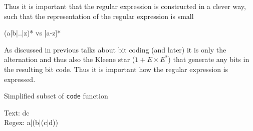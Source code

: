 \documentclass[slidestop,compress,mathserif, xcolor=table]{beamer}
\begin{document}
\begin{frame}
  
  Thus it is important that the regular expression is constructed in a clever
  way, such that the representation of the regular expression is small
  
  (a|b|..|z)* vs [a-z]* 
  
  As discussed in previous talks about bit coding (and later) it is only the
  alternation and thus also the Kleene star ($1 + E \times E^{\ast}$) that generate
  any bits in the resulting bit code.  Thus it is important how the regular
  expression is expressed.

  \begin{block}{Simplified subset of \texttt{code} function}
\begin{semiverbatim}
\end{semiverbatim}
  \end{block}

  \begin{example}
    Text: dc\\
    Regex: a|(b|(c|d))
    
  \end{example}

\end{frame}
\end{document}

